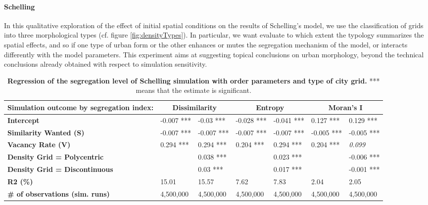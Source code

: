 \documentclass[Afour,sageh,times]{sagej}
\begin{document}

\paragraph{Schelling} In this qualitative exploration of the effect of initial spatial conditions on the results of Schelling's model, we use the classification of grids into three morphological types (cf. figure \ref{fig:densityTypes}). In particular, we want evaluate to which extent the typology summarizes the spatial effects, and so if one type of urban form or the other enhances or mutes the segregation mechanism of the model, or interacts differently with the model parameters. This experiment aims at suggesting topical conclusions on urban morphology, beyond the technical conclusions already obtained with respect to simulation sensitivity.

\begin{table}[htbp]
\centering
\begin{tabular}{|l|ll|ll|ll|}
\hline
Simulation outcome by segregation index: & \multicolumn{2}{c|}{\textbf{Dissimilarity}} & \multicolumn{2}{c|}{\textbf{Entropy}} & \multicolumn{2}{c|}{\textbf{Moran's I}} \\ \hline
\textbf{Intercept}                       & -0.007 ***  & -0.03 ***                     & -0.028 ***        & -0.041 ***        & 0.127 ***        & 0.129 ***            \\ \hline
\textbf{Similarity Wanted (S)}           & -0.007 ***  & -0.007 ***                    & -0.007 ***        & -0.007 ***        & -0.005 ***       & -0.005 ***           \\ 
\textbf{Vacancy Rate (V)}                & 0.294 ***   & 0.294 ***                     & 0.204 ***         & 0.294 ***         & 0.204 ***        & \textit{0.099}       \\ \hline
\textbf{Density Grid = Polycentric}      &             & 0.038 ***                     &                   & 0.023 ***         &                  & -0.006 ***           \\ 
\textbf{Density Grid = Discontinuous}    &             & 0.03 ***                     &                   & 0.017 ***         &                  & -0.001 ***           \\ \hline
\textbf{R2 (\%)}                         & 15.01       & 15.57  & 7.62              & 7.83              & 2.04             & 2.05                 \\ 
\textbf{\# of observations (sim. runs)}  & 4,500,000   & 4,500,000                     & 4,500,000         & 4,500,000         & 4,500,000        & 4,500,000            \\ \hline
\end{tabular}
\caption{\textbf{Regression of the segregation level of Schelling simulation with order parameters and type of city grid.} *** means that the estimate is significant.}
\label{tab:regressionSchelling}
\end{table}
\end{document}
